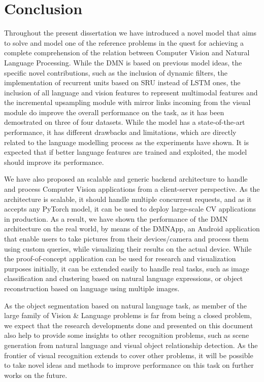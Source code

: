 \chapter{Conclusion}
\label{conclusion}

Throughout the present dissertation we have introduced a novel model that aims to solve and model one of the reference problems in the quest for achieving a complete comprehension of the relation between Computer Vision and Natural Language Processing. While the DMN is based on previous model ideas, the specific novel contributions, such as the inclusion of dynamic filters, the implementation of recurrent units based on SRU instead of LSTM ones, the inclusion of all language and vision features to represent multimodal features and the incremental upsampling module with mirror links incoming from the visual module do improve the overall performance on the task, as it has been demostrated on three of four datasets. While the model has a state-of-the-art performance, it has different drawbacks and limitations, which are directly related to the language modelling process as the experiments have shown. It is expected that if better language features are trained and exploited, the model should improve its performance.

We have also proposed an scalable and generic backend architecture to handle and process Computer Vision applications from a client-server perspective. As the architecture is scalable, it should handle multiple concurrent requests, and as it accepts any PyTorch model, it can be used to deploy large-scale CV applications in production. As a result, we have shown the performance of the DMN architecture on the real world, by means of the DMNApp, an Android application that enable users to take pictures from their devices/camera and process them using custom queries, while visualizing their results on the actual device. While the proof-of-concept application can be used for research and visualization purposes initially, it can be extended easily to handle real tasks, such as image classification and clustering based on natural language expressions, or object reconstruction based on language using multiple images.

As the object segmentation based on natural language task, as member of the large family of Vision \& Language problems is far from being a closed problem, we expect that the research developments done and presented on this document also help to provide some insights to other recognition problems, such as scene generation from natural language and visual object relationship detection. As the frontier of visual recognition extends to cover other problems, it will be possible to take novel ideas and methods to improve performance on this task on further works on the future.
